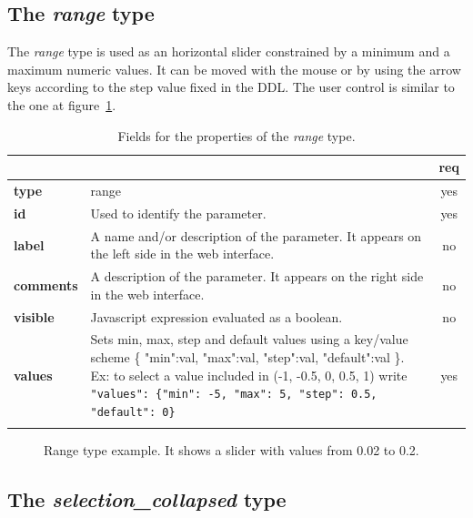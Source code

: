 \subsection{The \emph{range} type}

The \emph{range} type is used as an horizontal slider constrained by a minimum and a maximum numeric values. It can be moved with the mouse or by using the arrow keys according to the step value fixed in the DDL. The user control is similar to the one at figure~\ref{fig:sliders}.

\begin{longtable}{|>{\bf}L{\linewidth}|L{\linewidth}|c|}
\hline
      &  & {\bf req} 
\tabularnewline \hline \hline
 type   & range       & yes \\ \hline
 id     & Used to identify the parameter. & yes \\ \hline
 label  & A name and/or description of the parameter. It appears on the left side in the web interface. & no
                      \\ \hline
 comments & A description of the parameter. It appears on the right side in the web interface. & no
                      \\ \hline
 visible    & Javascript expression evaluated as a boolean. & no \\ \hline
 values & Sets min, max, step and default values using a key/value 
scheme \{ "min":val, "max":val, "step":val, "default":val \}. 
Ex: to select a value included in (-1, -0.5, 0, 0.5, 1) write \texttt{"values": \{"min": -5, "max": 5, "step": 0.5, "default": 0\}}  & yes
                      \\ \hline
\caption{Fields for the properties of the \emph{range} type.}
\end{longtable}

\begin{figure}[h]
\centering
{}
\caption{Range type example. It shows a slider with values from 0.02 to 0.2.}
\label{fig:sliders}
\end{figure}

\subsection{The \emph{selection\_collapsed} type}

